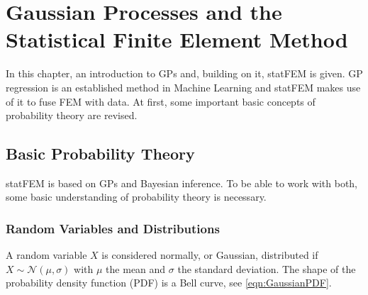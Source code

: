 \documentclass[%
  a4paper,oneside,%
  11pt,%
  smallchapters,
  style=printdev,
  extramargin,
  green,%
  rgb, <cmyk>
  ]{tubsbook}
\begin{document}
\chapter{Gaussian Processes and the Statistical Finite Element Method}
In this chapter, an introduction to GPs and, building on it, statFEM is given. GP regression is an established method in Machine Learning and statFEM makes use of it to fuse FEM with data. At first, some important basic concepts of probability theory are revised.



\section{Basic Probability Theory}
statFEM is based on GPs and Bayesian inference. To be able to work with both, some basic understanding of probability theory is necessary.


\subsection{Random Variables and Distributions}
\label{sec:MultiGauss}

A random variable $X$ is considered normally, or Gaussian, distributed if $X \sim \mathcal{N}(\mu, \sigma)$ with $\mu$ the mean and $\sigma$ the standard deviation. The shape of the probability density function (PDF) is a Bell curve, see \eqref{eqn:GaussianPDF}.
\end{document}

